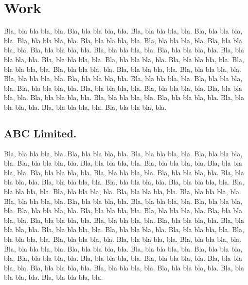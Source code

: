 \documentclass{dd}
\begin{document}
\section{Work}
Bla, bla bla bla, bla.
Bla, bla bla bla, bla.
Bla, bla bla bla, bla.
Bla, bla bla bla, bla.
Bla, bla bla bla, bla.
Bla, bla bla bla, bla.
Bla, bla bla bla, bla.
Bla, bla bla bla, bla.
Bla, bla bla bla, bla.
Bla, bla bla bla, bla.
Bla, bla bla bla, bla.
Bla, bla bla bla, bla.
Bla, bla bla bla, bla.
Bla, bla bla bla, bla.
Bla, bla bla bla, bla.
Bla, bla bla bla, bla.
Bla, bla bla bla, bla.
Bla, bla bla bla, bla.
Bla, bla bla bla, bla.
Bla, bla bla bla, bla.
Bla, bla bla bla, bla.
Bla, bla bla bla, bla.
Bla, bla bla bla, bla.
Bla, bla bla bla, bla.
Bla, bla bla bla, bla.
Bla, bla bla bla, bla.
Bla, bla bla bla, bla.
Bla, bla bla bla, bla.
Bla, bla bla bla, bla.
Bla, bla bla bla, bla.
Bla, bla bla bla, bla.
Bla, bla bla bla, bla.
Bla, bla bla bla, bla.
\subsection{ABC Limited.}

Bla, bla bla bla, bla.
Bla, bla bla bla, bla.
Bla, bla bla bla, bla.
Bla, bla bla bla, bla.
Bla, bla bla bla, bla.
Bla, bla bla bla, bla.
Bla, bla bla bla, bla.
Bla, bla bla bla, bla.
Bla, bla bla bla, bla.
Bla, bla bla bla, bla.
Bla, bla bla bla, bla.
Bla, bla bla bla, bla.
Bla, bla bla bla, bla.
Bla, bla bla bla, bla.
Bla, bla bla bla, bla.
Bla, bla bla bla, bla.
Bla, bla bla bla, bla.
Bla, bla bla bla, bla.
Bla, bla bla bla, bla.
Bla, bla bla bla, bla.
Bla, bla bla bla, bla.
Bla, bla bla bla, bla.
Bla, bla bla bla, bla.
Bla, bla bla bla, bla.
Bla, bla bla bla, bla.
Bla, bla bla bla, bla.
Bla, bla bla bla, bla.
Bla, bla bla bla, bla.
Bla, bla bla bla, bla.
Bla, bla bla bla, bla.
Bla, bla bla bla, bla.
Bla, bla bla bla, bla.
Bla, bla bla bla, bla.
Bla, bla bla bla, bla.
Bla, bla bla bla, bla.
Bla, bla bla bla, bla.
Bla, bla bla bla, bla.
Bla, bla bla bla, bla.
Bla, bla bla bla, bla.
Bla, bla bla bla, bla.
Bla, bla bla bla, bla.
Bla, bla bla bla, bla.
Bla, bla bla bla, bla.
Bla, bla bla bla, bla.
Bla, bla bla bla, bla.
Bla, bla bla bla, bla.
Bla, bla bla bla, bla.
Bla, bla bla bla, bla.
Bla, bla bla bla, bla.
Bla, bla bla bla, bla.
Bla, bla bla bla, bla.
\end{document}
